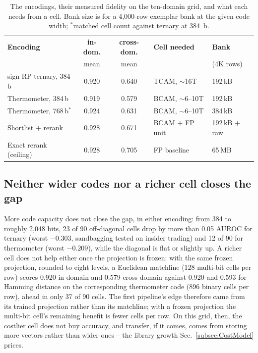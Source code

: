 \documentclass[conference]{IEEEtran}
\newcommand{\tcam}{{TCAM}\xspace}
\newcommand{\auroc}{{AUROC}\xspace}
\newcommand{\signrp}{{sign-RP}\xspace}
\begin{document}
\begin{table}[t]
\centering
\caption{The encodings, their measured fidelity on the ten-domain
grid, and what each needs from a cell. Bank size is for a
4{,}000-row exemplar bank at the given code width; $^{*}$matched
cell count against ternary at 384~b.}
\label{tab:encodings}
{\scriptsize\setlength{\tabcolsep}{3.5pt}
\begin{tabular}{@{}lccll@{}}
\toprule
\textbf{Encoding} & \textbf{in-dom.} & \textbf{cross-dom.} &
\textbf{Cell needed} & \textbf{Bank} \\
 & mean & mean & & (4K rows) \\
\midrule
\signrp ternary, 384\,b       & 0.920 & 0.640 & \tcam, $\sim$16T   & 192\,kB \\
Thermometer, 384\,b           & 0.919 & 0.579 & BCAM, $\sim$6--10T & 192\,kB \\
Thermometer, 768\,b$^{*}$          & 0.924 & 0.631 & BCAM, $\sim$6--10T & 384\,kB \\
Shortlist $+$ rerank          & 0.928 & 0.671 & BCAM $+$ FP unit   & 192\,kB $+$ raw \\
Exact rerank (ceiling)        & 0.928 & 0.705 & FP baseline        & 65\,MB \\
\bottomrule
\end{tabular}}
\end{table}

\subsection{Neither wider codes nor a richer cell closes the gap}
\label{subsec:BitWidth}
More code capacity does not close the gap, in either encoding: from
384 to roughly 2{,}048 bits, 23 of 90 off-diagonal
cells drop by more than 0.05 \auroc for ternary (worst $-0.303$,
sandbagging tested on insider trading) and 12 of 90 for thermometer
(worst $-0.209$), while the diagonal is flat or slightly up. A
richer cell does not help either once the projection is frozen: with
the same frozen projection, rounded to eight levels, a Euclidean
matchline (128 multi-bit cells per row)
scores 0.920 in-domain and 0.579 cross-domain against 0.920 and 0.593
for Hamming distance on the corresponding thermometer code (896
binary cells per row), ahead in only 37 of 90 cells. The first
pipeline's edge therefore came from its trained projection rather
than its matchline; with a frozen projection the multi-bit cell's
remaining benefit is fewer cells per row. On this grid, then, the
costlier cell does not buy accuracy, and transfer, if it comes, comes
from storing more vectors rather than wider ones -- the library
growth Sec.~\ref{subsec:CostModel} prices.
\end{document}
